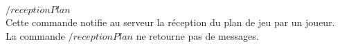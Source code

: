 \par

$/receptionPlan$\\
Cette commande notifie au serveur la réception du plan de jeu par un joueur.\\

La commande $/receptionPlan$ ne retourne pas de messages.\\